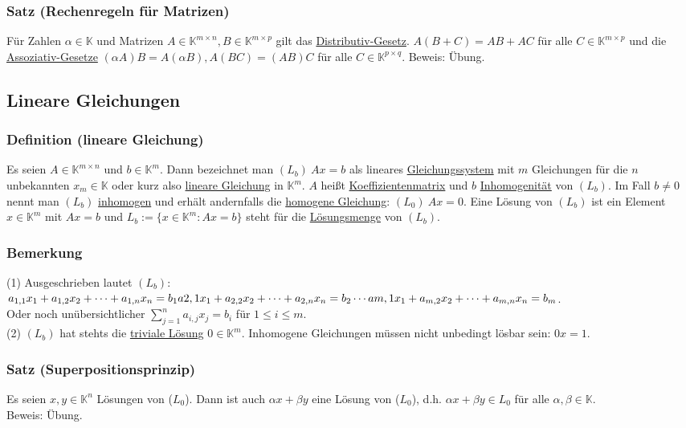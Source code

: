\subsubsection{Satz (Rechenregeln für Matrizen)}
Für Zahlen $\alpha \in \mathbb{K}$ und Matrizen $A\in \mathbb{K}^{m\times n},B\in\mathbb{K}^{m\times p}$ gilt das \underline{Distributiv-Gesetz}.  $A(B+C)=AB+AC$ für alle $C\in \mathbb{K}^{m\times p}$ und die \underline{Assoziativ-Gesetze} $(\alpha A)B=A(\alpha B), A(BC)=(AB)C$ für alle $C\in \mathbb{K}^{p\times q}$.
Beweis: Übung.
\subsection{Lineare Gleichungen}
\subsubsection{Definition (lineare Gleichung)}
Es seien $A\in \mathbb{K}^{m\times n}$ und $b\in \mathbb{K}^{m}$.  Dann bezeichnet man $(L_b)\ Ax=b$ als lineares \underline{Gleichungssystem} mit $m$ Gleichungen für die $n$ unbekannten $x_m\in \mathbb{K}$ oder kurz also \underline{lineare Gleichung} in $\mathbb{K}^m$.  $A$ heißt \underline{Koeffizientenmatrix} und $b$ \underline{Inhomogenität} von $(L_b)$.  Im Fall $b\not= 0$ nennt man $(L_b)$ \underline{inhomogen} und erhält andernfalls die \underline{homogene Gleichung}: $(L_0)\ Ax=0$.  Eine Lösung von $(L_b)$ ist ein Element $x\in \mathbb{K}^m$ mit $Ax=b$ und $L_b:=\{ x\in \mathbb{K}^m:Ax=b\}$ steht für die \underline{Lösungsmenge} von $(L_b)$.
\subsubsection{Bemerkung}
(1) Ausgeschrieben lautet $(L_b)$:\\$a_{1,1}x_1+a_{1,2}x_2+\cdots +a_{1,n}x_n = b_1\\a{2,1}x_1+a_{2,2}x_2+\cdots +a_{2,n}x_n = b_2\\\cdots \\a{m,1}x_1+a_{m,2}x_2+\cdots +a_{m,n}x_n=b_m$.\\Oder noch unübersichtlicher $\sum^n_{j=1} a_{i,j}x_j = b_i$ für $1\leq i\leq m$.\\
(2) $(L_b)$ hat stehts die \underline{triviale Lösung} $0\in \mathbb{K}^m$.  Inhomogene Gleichungen müssen nicht unbedingt lösbar sein: $0x=1$.\\
\subsubsection{Satz (Superpositionsprinzip)}
Es seien $x,y \in \mathbb{K}^n$ Lösungen von ($L_0$).  Dann ist auch $\alpha x+\beta y$ eine Lösung von ($L_0$), d.h. $\alpha x+\beta y\in L_0$ für alle $\alpha ,\beta \in \mathbb{K}$. \\
Beweis: Übung.
